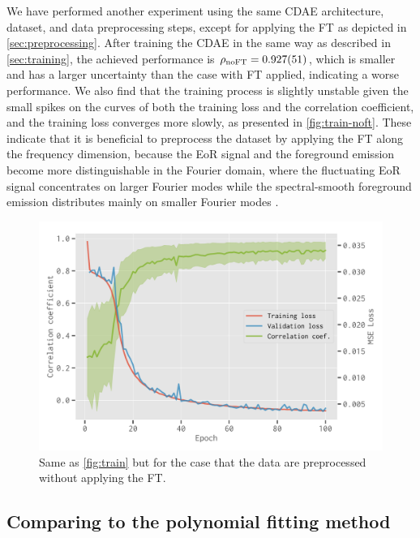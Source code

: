 \documentclass[letters,fleqn,usenatbib]{mnras}
\newlength{\myfigwidth}
\newcommand{\R}[1]{\mathrm{#1}}
\begin{document}
We have performed another experiment using the same CDAE architecture,
dataset, and data preprocessing steps, except for applying the FT
as depicted in \autoref{sec:preprocessing}.
After training the CDAE in the same way as described in
\autoref{sec:training}, the achieved performance is
$\rho_{\R{noFT}} = \num{0.927 +- 0.051}$, which is smaller and has a
larger uncertainty than the case with FT applied, indicating a worse
performance.
We also find that the training process is slightly unstable given the
small spikes on the curves of both the training loss and the correlation
coefficient, and the training loss converges more slowly,
as presented in \autoref{fig:train-noft}.
These indicate that it is beneficial to preprocess the
dataset by applying the FT along the frequency dimension, because the
EoR signal and the foreground emission become more distinguishable
in the Fourier domain, where the fluctuating EoR signal concentrates on
larger Fourier modes while the spectral-smooth foreground emission
distributes mainly on smaller Fourier modes \citep[e.g.,][]{parsons2012}.

\begin{figure}
  \centering
  \includegraphics[width=\myfigwidth]{cdae-train-noft}
  \caption{\label{fig:train-noft}%
    Same as \autoref{fig:train} but for the case that the data are
    preprocessed without applying the FT.
  }
\end{figure}


\subsection{Comparing to the polynomial fitting method}
\label{sec:polyfit}
\end{document}

